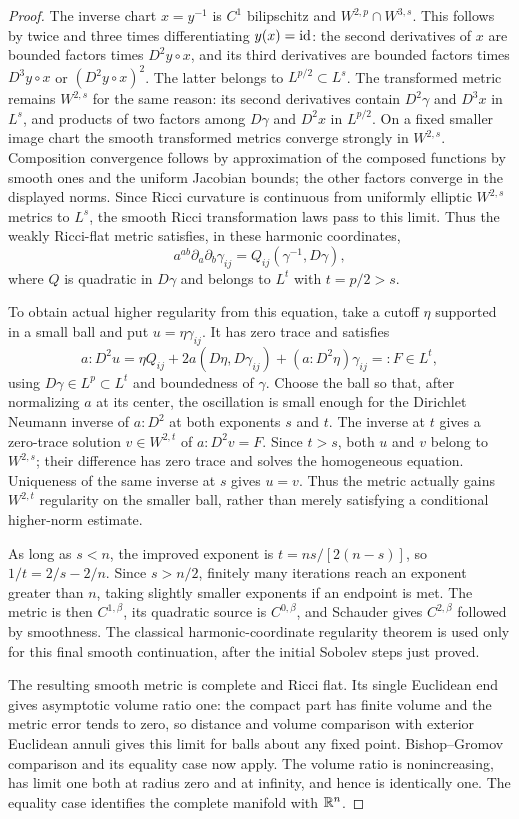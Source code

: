 \begin{proof}
The inverse chart $x=y^{-1}$ is $C^1$ bilipschitz and
$W^{2,p}\cap W^{3,s}$. This follows by twice and three times
differentiating $y(x)=\operatorname{id}$: the second derivatives of $x$ are
bounded factors times $D^2y\circ x$, and its third derivatives
are bounded factors times $D^3y\circ x$ or
$(D^2y\circ x)^2$. The latter belongs to $L^{p/2}\subset L^s$.
The transformed metric remains $W^{2,s}$ for the same reason:
its second derivatives contain $D^2\gamma$ and $D^3x$ in $L^s$,
and products of two factors among $D\gamma$ and $D^2x$ in
$L^{p/2}$. On a fixed smaller image chart the smooth transformed
metrics converge strongly in $W^{2,s}$. Composition convergence
follows by approximation of the composed functions by smooth
ones and the uniform Jacobian bounds; the other factors converge
in the displayed norms. Since Ricci curvature is continuous
from uniformly elliptic $W^{2,s}$ metrics to $L^s$, the smooth
Ricci transformation laws pass to this limit. Thus the weakly
Ricci-flat metric satisfies, in these harmonic coordinates,
\[
 a^{ab}\partial_a\partial_b\gamma_{ij}
        =Q_{ij}(\gamma^{-1},D\gamma),
\]
where $Q$ is quadratic in $D\gamma$ and belongs to $L^t$ with
$t=p/2>s$.

To obtain actual higher regularity from this equation, take a
cutoff $\eta$ supported in a small ball and put
$u=\eta\gamma_{ij}$. It has zero trace and satisfies
\[
 a:D^2u=\eta Q_{ij}
       +2a(D\eta,D\gamma_{ij})+(a:D^2\eta)\gamma_{ij}
       =:F\in L^t,
\]
using $D\gamma\in L^p\subset L^t$ and boundedness of
$\gamma$. Choose the ball so that, after normalizing $a$ at
its center, the oscillation is small enough for the Dirichlet
Neumann inverse of $a:D^2$ at both exponents $s$ and $t$.
The inverse at $t$ gives a zero-trace solution
$v\in W^{2,t}$ of $a:D^2v=F$. Since $t>s$, both $u$ and
$v$ belong to $W^{2,s}$; their difference has zero trace and
solves the homogeneous equation. Uniqueness of the same inverse
at $s$ gives $u=v$. Thus the metric actually gains $W^{2,t}$
regularity on the smaller ball, rather than merely satisfying a
conditional higher-norm estimate.

As long as $s<n$, the improved exponent is
$t=ns/[2(n-s)]$, so $1/t=2/s-2/n$. Since $s>n/2$, finitely
many iterations reach an exponent greater than $n$, taking
slightly smaller exponents if an endpoint is met. The metric
is then $C^{1,\beta}$, its quadratic source is $C^{0,\beta}$,
and Schauder gives $C^{2,\beta}$ followed by smoothness.
The classical harmonic-coordinate regularity theorem
\cite{DeTurckKazdan1981} is used only for this final smooth
continuation, after the initial Sobolev steps just proved.

The resulting smooth metric is complete and Ricci flat. Its single
Euclidean end gives asymptotic volume ratio one: the compact part
has finite volume and the metric error tends to zero, so distance
and volume comparison with exterior Euclidean annuli gives this
limit for balls about any fixed point. Bishop--Gromov comparison
and its equality case \cite{Wei2007} now apply. The volume ratio
is nonincreasing, has limit one both at radius zero and at infinity,
and hence is identically one. The equality case identifies the
complete manifold with $\mathbb R^n$.
\end{proof}

